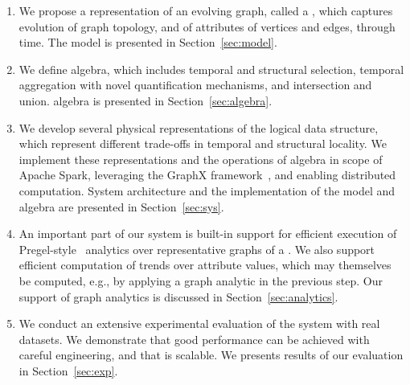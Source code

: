 \begin{enumerate}[noitemsep,leftmargin=*]

\item We propose a representation of an evolving graph, called a \tg,
  which captures evolution of graph topology, and of attributes of
  vertices and edges, through time.  The \tg model is presented in
  Section~\ref{sec:model}.

\item We define \tg algebra, which includes temporal and structural
  selection, temporal aggregation with novel quantification
  mechanisms, and \tg intersection and union.  \tg algebra is presented in
  Section~\ref{sec:algebra}.

\item We develop several physical representations of the logical \tg
  data structure, which represent different trade-offs in temporal and
  structural locality.  We implement these representations
  and the operations of \tg algebra in scope of Apache Spark,
  leveraging the GraphX
  framework~\cite{DBLP:conf/osdi/GonzalezXDCFS14}, and enabling
  distributed computation. System architecture and the implementation
  of the \tg model and algebra are presented in Section~\ref{sec:sys}.

\item An important part of our system is built-in support for
  efficient execution of
  Pregel-style~\cite{DBLP:conf/sigmod/MalewiczABDHLC10} analytics over
  representative graphs of a \tg.  We also support efficient
  computation of trends over attribute values, which may themselves be
  computed, e.g., by applying a graph analytic in the previous step.
  Our support of graph analytics is discussed in
  Section~\ref{sec:analytics}.

\item We conduct an extensive experimental evaluation of the \ql
  system with real datasets.  We demonstrate that good performance can
  be achieved with careful engineering, and that \ql is scalable.  We
  presents results of our evaluation in Section~\ref{sec:exp}.

\end{enumerate}

